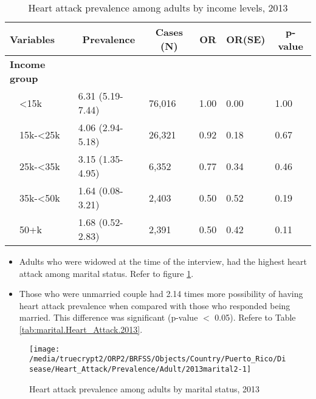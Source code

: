 \begin{table}[H]
\caption{Heart attack prevalence  among adults by income levels, 2013\label{tab:income.Heart_Attack.2013}} 
\begin{center}
\begin{tabular}{llllll}
\hline\hline
\multicolumn{1}{l}{Variables}&\multicolumn{1}{c}{Prevalence}&\multicolumn{1}{c}{Cases (N)}&\multicolumn{1}{c}{OR}&\multicolumn{1}{c}{OR(SE)}&\multicolumn{1}{c}{p-value}\tabularnewline
\hline
{\bfseries Income group}&&&&&\tabularnewline
~~\textless15k&6.31 (5.19-7.44)&76,016&1.00&0.00&1.00\tabularnewline
~~15k-\textless25k&4.06 (2.94-5.18)&26,321&0.92&0.18&0.67\tabularnewline
~~25k-\textless35k&3.15 (1.35-4.95)& 6,352&0.77&0.34&0.46\tabularnewline
~~35k-\textless50k&1.64 (0.08-3.21)& 2,403&0.50&0.52&0.19\tabularnewline
~~50+k&1.68 (0.52-2.83)& 2,391&0.50&0.42&0.11\tabularnewline
\hline
\end{tabular}\end{center}

\end{table}

 \newpage
\begin{itemize}

\item Adults who were 
widowed at the time of the interview, had the highest heart attack among marital status. Refer to figure \ref{fig:marital.Heart_Attack.2013}.

\item Those who were unmarried couple had 2.14 times more possibility of having heart attack prevalence when compared with those who responded being married. This difference was significant (p-value $<$ 0.05). Refere to Table \ref{tab:marital.Heart_Attack.2013}.

\end{itemize}

\begin{figure}[H]
\caption{Heart attack prevalence among adults by marital status,
         2013}
\label{fig:marital.Heart_Attack.2013}
\begin{knitrout}
\color{fgcolor}

{\centering \texttt{[image: /media/truecrypt2/ORP2/BRFSS/Objects/Country/Puerto\_Rico/Disease/Heart\_Attack/Prevalence/Adult/2013marital2-1]} 

}



\end{knitrout}
 \end{figure}

